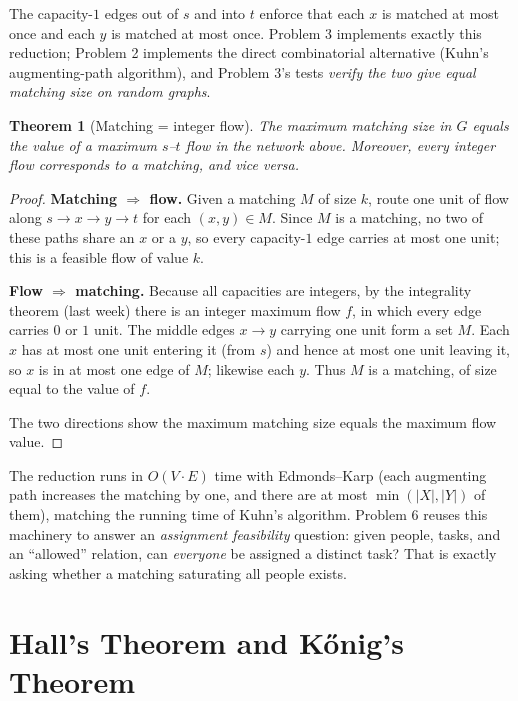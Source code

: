 \documentclass[11pt]{article}
\newtheorem{theorem}{Theorem}[section]
\begin{document}
The capacity-$1$ edges out of $s$ and into $t$ enforce that each $x$ is matched
at most once and each $y$ is matched at most once. Problem 3 implements exactly
this reduction; Problem 2 implements the direct combinatorial alternative
(Kuhn's augmenting-path algorithm), and Problem 3's tests \emph{verify the two
give equal matching size on random graphs}.

\begin{theorem}[Matching = integer flow]
\label{thm:matching-flow}
The maximum matching size in $G$ equals the value of a maximum $s$--$t$ flow in
the network above. Moreover, every integer flow corresponds to a matching, and
vice versa.
\end{theorem}

\begin{proof}
\textbf{Matching $\Rightarrow$ flow.} Given a matching $M$ of size $k$, route one
unit of flow along $s \to x \to y \to t$ for each $(x,y) \in M$. Since $M$ is a
matching, no two of these paths share an $x$ or a $y$, so every capacity-$1$
edge carries at most one unit; this is a feasible flow of value $k$.

\textbf{Flow $\Rightarrow$ matching.} Because all capacities are integers, by the
integrality theorem (last week) there is an integer maximum flow $f$, in which
every edge carries $0$ or $1$ unit. The middle edges $x \to y$ carrying one unit
form a set $M$. Each $x$ has at most one unit entering it (from $s$) and hence at
most one unit leaving it, so $x$ is in at most one edge of $M$; likewise each
$y$. Thus $M$ is a matching, of size equal to the value of $f$.

The two directions show the maximum matching size equals the maximum flow value.
\end{proof}

The reduction runs in $O(V \cdot E)$ time with Edmonds--Karp (each augmenting
path increases the matching by one, and there are at most $\min(|X|,|Y|)$ of
them), matching the running time of Kuhn's algorithm. Problem 6 reuses this
machinery to answer an \emph{assignment feasibility} question: given people,
tasks, and an ``allowed'' relation, can \emph{everyone} be assigned a distinct
task? That is exactly asking whether a matching saturating all people exists.

\section{Hall's Theorem and K\H{o}nig's Theorem}
\end{document}
